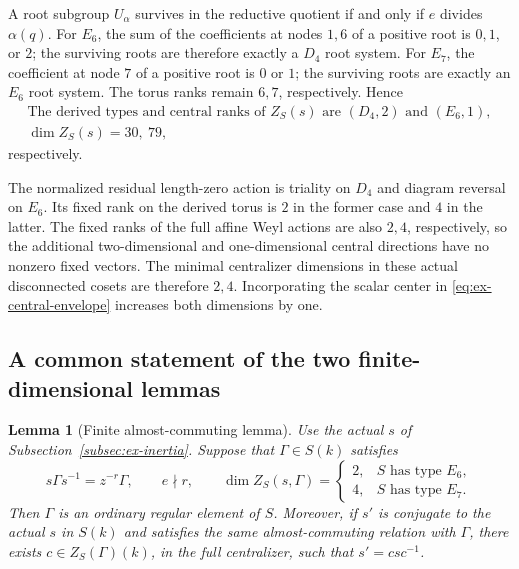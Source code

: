 \documentclass[11pt,a4paper]{article}
\newtheorem{lemma}[theorem]{Lemma}
\theoremstyle{definition}
\theoremstyle{remark}
\begin{document}
A root subgroup \(U_\alpha\) survives in the reductive quotient if and
only if \(e\) divides \(\alpha(q)\). For \(E_6\), the sum of the
coefficients at nodes \(1,6\) of a positive root is \(0,1\), or \(2\);
the surviving roots are therefore exactly a \(D_4\) root system.
For \(E_7\), the coefficient at node \(7\) of a positive root is \(0\) or
\(1\); the surviving roots are exactly an \(E_6\) root system.
The torus ranks remain \(6,7\), respectively. Hence
\begin{equation}\label{eq:ex-inertia-centralizers}
\begin{gathered}
\text{The derived types and central ranks of }Z_S(s)
\text{ are }(D_4,2)\text{ and }(E_6,1),\\
\dim Z_S(s)=30,\ 79,
\end{gathered}
\end{equation}
respectively.

The normalized residual length-zero action is triality on \(D_4\) and
diagram reversal on \(E_6\). Its fixed rank on the derived torus is \(2\)
in the former case and \(4\) in the latter. The fixed ranks of the full
affine Weyl actions are also \(2,4\), respectively, so the additional
two-dimensional and one-dimensional central directions have no nonzero
fixed vectors. The minimal centralizer dimensions in these actual
disconnected cosets are therefore \(2,4\). Incorporating the scalar
center in \eqref{eq:ex-central-envelope} increases both dimensions by one.

\subsection{A common statement of the two finite-dimensional lemmas}
\label{subsec:ex-finite-statement}

\begin{lemma}[Finite almost-commuting lemma]\label{lem:exceptional-finite}
Use the actual \(s\) of Subsection~\ref{subsec:ex-inertia}.
Suppose that \(\Gamma\in S(k)\) satisfies
\begin{equation}\label{eq:ex-almost-commuting}
s\Gamma s^{-1}=z^{-r}\Gamma,\qquad e\nmid r,
\qquad
\dim Z_S(s,\Gamma)=
\begin{cases}
2,&S\text{ has type }E_6,\\
4,&S\text{ has type }E_7.
\end{cases}
\end{equation}
Then \(\Gamma\) is an ordinary regular element of \(S\).
Moreover, if \(s'\) is conjugate to the actual \(s\) in \(S(k)\) and
satisfies the same almost-commuting relation with \(\Gamma\), there exists
\(c\in Z_S(\Gamma)(k)\), in the full centralizer, such that
\(s'=csc^{-1}\).
\end{lemma}
\end{document}
